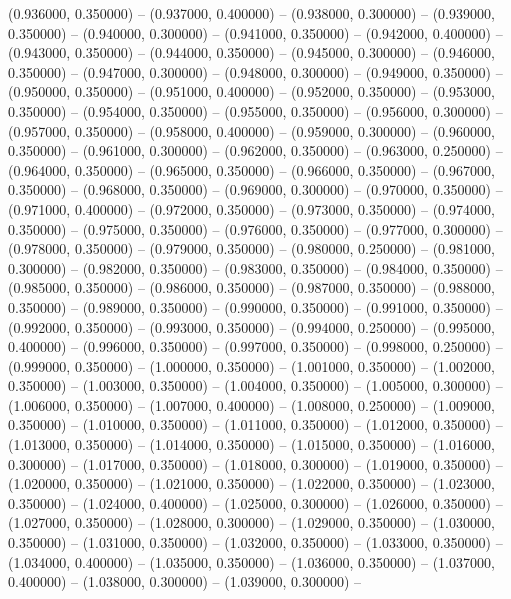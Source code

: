 (0.936000, 0.350000) -- 
(0.937000, 0.400000) -- 
(0.938000, 0.300000) -- 
(0.939000, 0.350000) -- 
(0.940000, 0.300000) -- 
(0.941000, 0.350000) -- 
(0.942000, 0.400000) -- 
(0.943000, 0.350000) -- 
(0.944000, 0.350000) -- 
(0.945000, 0.300000) -- 
(0.946000, 0.350000) -- 
(0.947000, 0.300000) -- 
(0.948000, 0.300000) -- 
(0.949000, 0.350000) -- 
(0.950000, 0.350000) -- 
(0.951000, 0.400000) -- 
(0.952000, 0.350000) -- 
(0.953000, 0.350000) -- 
(0.954000, 0.350000) -- 
(0.955000, 0.350000) -- 
(0.956000, 0.300000) -- 
(0.957000, 0.350000) -- 
(0.958000, 0.400000) -- 
(0.959000, 0.300000) -- 
(0.960000, 0.350000) -- 
(0.961000, 0.300000) -- 
(0.962000, 0.350000) -- 
(0.963000, 0.250000) -- 
(0.964000, 0.350000) -- 
(0.965000, 0.350000) -- 
(0.966000, 0.350000) -- 
(0.967000, 0.350000) -- 
(0.968000, 0.350000) -- 
(0.969000, 0.300000) -- 
(0.970000, 0.350000) -- 
(0.971000, 0.400000) -- 
(0.972000, 0.350000) -- 
(0.973000, 0.350000) -- 
(0.974000, 0.350000) -- 
(0.975000, 0.350000) -- 
(0.976000, 0.350000) -- 
(0.977000, 0.300000) -- 
(0.978000, 0.350000) -- 
(0.979000, 0.350000) -- 
(0.980000, 0.250000) -- 
(0.981000, 0.300000) -- 
(0.982000, 0.350000) -- 
(0.983000, 0.350000) -- 
(0.984000, 0.350000) -- 
(0.985000, 0.350000) -- 
(0.986000, 0.350000) -- 
(0.987000, 0.350000) -- 
(0.988000, 0.350000) -- 
(0.989000, 0.350000) -- 
(0.990000, 0.350000) -- 
(0.991000, 0.350000) -- 
(0.992000, 0.350000) -- 
(0.993000, 0.350000) -- 
(0.994000, 0.250000) -- 
(0.995000, 0.400000) -- 
(0.996000, 0.350000) -- 
(0.997000, 0.350000) -- 
(0.998000, 0.250000) -- 
(0.999000, 0.350000) -- 
(1.000000, 0.350000) -- 
(1.001000, 0.350000) -- 
(1.002000, 0.350000) -- 
(1.003000, 0.350000) -- 
(1.004000, 0.350000) -- 
(1.005000, 0.300000) -- 
(1.006000, 0.350000) -- 
(1.007000, 0.400000) -- 
(1.008000, 0.250000) -- 
(1.009000, 0.350000) -- 
(1.010000, 0.350000) -- 
(1.011000, 0.350000) -- 
(1.012000, 0.350000) -- 
(1.013000, 0.350000) -- 
(1.014000, 0.350000) -- 
(1.015000, 0.350000) -- 
(1.016000, 0.300000) -- 
(1.017000, 0.350000) -- 
(1.018000, 0.300000) -- 
(1.019000, 0.350000) -- 
(1.020000, 0.350000) -- 
(1.021000, 0.350000) -- 
(1.022000, 0.350000) -- 
(1.023000, 0.350000) -- 
(1.024000, 0.400000) -- 
(1.025000, 0.300000) -- 
(1.026000, 0.350000) -- 
(1.027000, 0.350000) -- 
(1.028000, 0.300000) -- 
(1.029000, 0.350000) -- 
(1.030000, 0.350000) -- 
(1.031000, 0.350000) -- 
(1.032000, 0.350000) -- 
(1.033000, 0.350000) -- 
(1.034000, 0.400000) -- 
(1.035000, 0.350000) -- 
(1.036000, 0.350000) -- 
(1.037000, 0.400000) -- 
(1.038000, 0.300000) -- 
(1.039000, 0.300000) -- 
